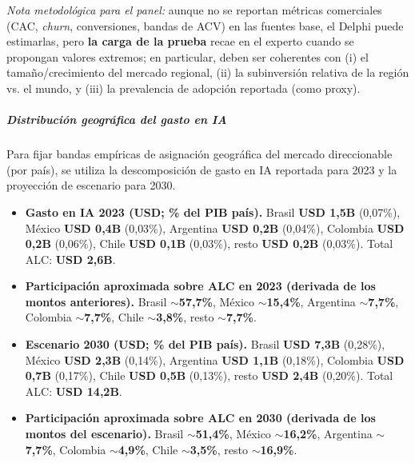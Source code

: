 \noindent \textit{Nota metodológica para el panel:} aunque no se reportan métricas comerciales (CAC, \textit{churn}, conversiones, bandas de ACV) en las fuentes base, el Delphi puede estimarlas, pero \textbf{la carga de la prueba} recae en el experto cuando se propongan valores extremos; en particular, deben ser coherentes con (i) el tamaño/crecimiento del mercado regional, (ii) la subinversión relativa de la región vs. el mundo, y (iii) la prevalencia de adopción reportada (como proxy). \parencite{GerosaHermansen2025EconomicWorkforceAI,JungKatz2025ImpactoEconomicoIAALC}

\subparagraph{Distribución geográfica del gasto en IA}

\noindent Para fijar bandas empíricas de asignación geográfica del mercado direccionable (por país), se utiliza la descomposición de gasto en IA reportada para 2023 y la proyección de escenario para 2030. \parencite{JungKatz2025ImpactoEconomicoIAALC}

\begin{itemize}
  \item \textbf{Gasto en IA 2023 (USD; \% del PIB país).} Brasil \textbf{USD 1{,}5B} (0{,}07\%), México \textbf{USD 0{,}4B} (0{,}03\%), Argentina \textbf{USD 0{,}2B} (0{,}04\%), Colombia \textbf{USD 0{,}2B} (0{,}06\%), Chile \textbf{USD 0{,}1B} (0{,}03\%), resto \textbf{USD 0{,}2B} (0{,}03\%). Total ALC: \textbf{USD 2{,}6B}. \parencite{JungKatz2025ImpactoEconomicoIAALC}

  \item \textbf{Participación aproximada sobre ALC en 2023 (derivada de los montos anteriores).} Brasil \textbf{$\sim$57{,}7\%}, México \textbf{$\sim$15{,}4\%}, Argentina \textbf{$\sim$7{,}7\%}, Colombia \textbf{$\sim$7{,}7\%}, Chile \textbf{$\sim$3{,}8\%}, resto \textbf{$\sim$7{,}7\%}. \parencite{JungKatz2025ImpactoEconomicoIAALC}

  \item \textbf{Escenario 2030 (USD; \% del PIB país).} Brasil \textbf{USD 7{,}3B} (0{,}28\%), México \textbf{USD 2{,}3B} (0{,}14\%), Argentina \textbf{USD 1{,}1B} (0{,}18\%), Colombia \textbf{USD 0{,}7B} (0{,}17\%), Chile \textbf{USD 0{,}5B} (0{,}13\%), resto \textbf{USD 2{,}4B} (0{,}20\%). Total ALC: \textbf{USD 14{,}2B}. \parencite{JungKatz2025ImpactoEconomicoIAALC}

  \item \textbf{Participación aproximada sobre ALC en 2030 (derivada de los montos del escenario).} Brasil \textbf{$\sim$51{,}4\%}, México \textbf{$\sim$16{,}2\%}, Argentina \textbf{$\sim$7{,}7\%}, Colombia \textbf{$\sim$4{,}9\%}, Chile \textbf{$\sim$3{,}5\%}, resto \textbf{$\sim$16{,}9\%}. \parencite{JungKatz2025ImpactoEconomicoIAALC}
\end{itemize}


